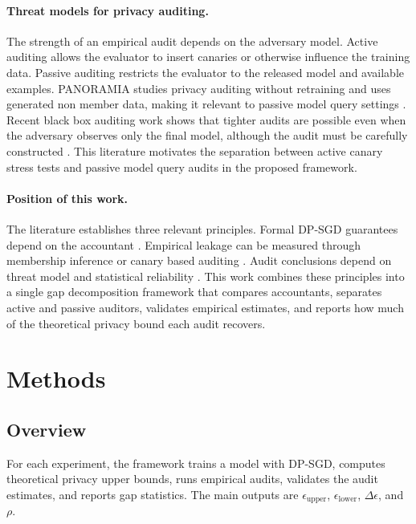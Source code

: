 \documentclass{article}
\begin{document}
\paragraph{Threat models for privacy auditing.}
The strength of an empirical audit depends on the adversary model. Active auditing allows the evaluator to insert canaries or otherwise influence the training data. Passive auditing restricts the evaluator to the released model and available examples. PANORAMIA studies privacy auditing without retraining and uses generated non member data, making it relevant to passive model query settings \citep{kazmi2024panoramia}. Recent black box auditing work shows that tighter audits are possible even when the adversary observes only the final model, although the audit must be carefully constructed \citep{annamalai2024nearly}. This literature motivates the separation between active canary stress tests and passive model query audits in the proposed framework.

\paragraph{Position of this work.}
The literature establishes three relevant principles. Formal DP-SGD guarantees depend on the accountant \citep{abadi2016deep,mironov2017renyi,gopi2021numerical}. Empirical leakage can be measured through membership inference or canary based auditing \citep{shokri2017membership,carlini2022membership,nasr2023tight,steinke2023privacy}. Audit conclusions depend on threat model and statistical reliability \citep{jagielski2020auditing,kazmi2024panoramia,annamalai2024nearly}. This work combines these principles into a single gap decomposition framework that compares accountants, separates active and passive auditors, validates empirical estimates, and reports how much of the theoretical privacy bound each audit recovers.

\section{Methods}
\subsection{Overview}
For each experiment, the framework trains a model with DP-SGD, computes theoretical privacy upper bounds, runs empirical audits, validates the audit estimates, and reports gap statistics. The main outputs are $\epsilon_{\mathrm{upper}}$, $\epsilon_{\mathrm{lower}}$, $\Delta \epsilon$, and $\rho$.
\end{document}
